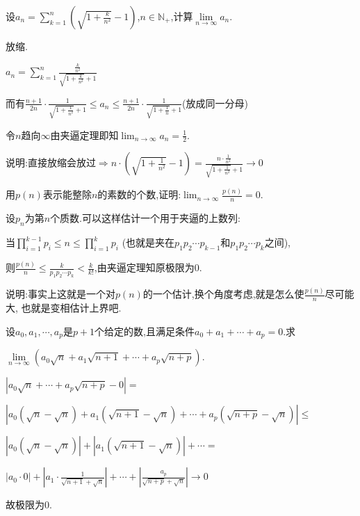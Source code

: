      \begin{exercise}
         设$a_n=\sum\limits _{k=1}^n \left(\sqrt{1+\frac{k}{n^2}}-1\right)$,$n\in \mathbb{N}_+$,计算$\lim\limits _{n\to \infty}a_n$.
     \end{exercise}
     \begin{solution}
         放缩.

         $a_n=\sum_{k=1}^n \frac{\frac{k}{n^2}}{\sqrt{1+\frac{k}{n^2}}+1}$

         而有$\frac{n+1}{2n}\cdot \frac{1}{\sqrt{1+\frac{1}{n^2}}+1}\leqslant a_n \leqslant \frac{n+1}{2n}\cdot\frac{1}{\sqrt{1+\frac{1}{n}}+1}$(放成同一分母)

         令$n$趋向$\infty$由夹逼定理即知$\lim_{n\to\infty}a_n=\frac{1}{2}$.

         说明:直接放缩会放过$\Longrightarrow n\cdot\left(\sqrt{1+\frac{1}{n^2}}-1\right)=\frac{n\cdot\frac{1}{n^2}}{\sqrt{1+\frac{1}{n^2}}+1}\rightarrow 0$
     \end{solution}

     \begin{exercise}
         用$p(n)$表示能整除$n$的素数的个数,证明:$\lim _{n\to \infty}\frac{p(n)}{n}=0$.
     \end{exercise}
     \begin{solution}
         设$p_n$为第$n$个质数.可以这样估计一个用于夹逼的上数列:

         当$\prod_{i=1}^{k-1}p_i\leqslant n\leqslant\prod_{i=1}^kp_i$
         (也就是夹在$p_1p_2\cdots p_{k-1}$和$p_1p_2\cdots p_k$之间),

         则$\frac{p(n)}{n}\leqslant \frac{k}{p_1p_2\cdots p_k}<\frac{k}{k!}$,由夹逼定理知原极限为0.

         说明:事实上这就是一个对$p(n)$的一个估计,换个角度考虑,就是怎么使$\frac{p(n)}{n}$尽可能大,
         也就是变相估计上界吧.
     \end{solution}

     \begin{exercise}
         设$a_0,a_1,\cdots,a_p$是$p+1$个给定的数,且满足条件$a_0+a_1+\cdots+a_p=0$.求

         $\lim\limits _{n\to \infty}\left(a_0\sqrt{n}+a_1\sqrt{n+1}+\cdots+a_p\sqrt{n+p}\right)$.

     \end{exercise}
     \begin{solution}

         $\left|a_0\sqrt{n}+\cdots+a_p\sqrt{n+p}-0\right|=$

         $\left|a_0(\sqrt{n}-\sqrt{n})+a_1(\sqrt{n+1}-\sqrt{n})+\cdots+a_p(\sqrt{n+p}-\sqrt{n})\right|\leqslant$

         $\left|a_0(\sqrt{n}-\sqrt{n})\right|+\left|a_1(\sqrt{n+1}-\sqrt{n})\right|+\cdots=$

         $\left|a_0\cdot0\right|+\left|a_1\cdot\frac{1}{\sqrt{n+1}+\sqrt{n}}\right|+\cdots+\left|\frac{a_p}{\sqrt{n+p}+\sqrt{n}}\right|\to 0$

         故极限为0.
     \end{solution}

